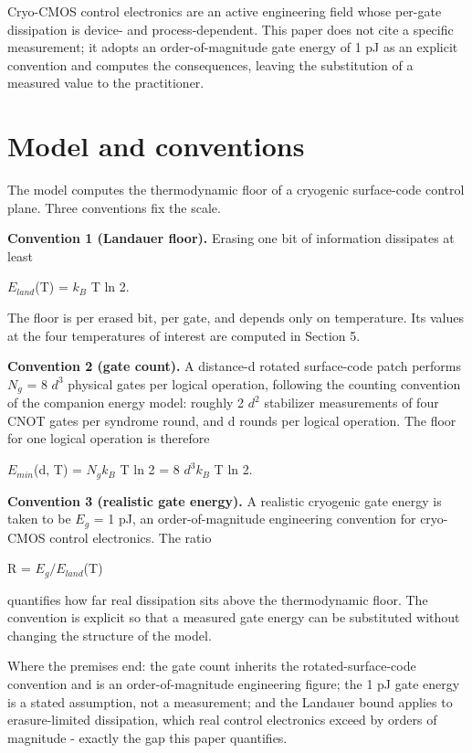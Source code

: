 \documentclass[11pt]{article}
\begin{document}
Cryo-CMOS control electronics are an active engineering field whose per-gate dissipation is device- and process-dependent. This paper does not cite a specific measurement; it adopts an order-of-magnitude gate energy of 1 pJ as an explicit convention and computes the consequences, leaving the substitution of a measured value to the practitioner.

\section{Model and conventions}
The model computes the thermodynamic floor of a cryogenic surface-code control plane. Three conventions fix the scale.

\textbf{Convention 1 (Landauer floor).} Erasing one bit of information dissipates at least

$E_{land}$(T) = $k_{B}$ T ln 2.

The floor is per erased bit, per gate, and depends only on temperature. Its values at the four temperatures of interest are computed in Section 5.

\textbf{Convention 2 (gate count).} A distance-d rotated surface-code patch performs $N_{g}$ = 8 $d^{3}$ physical gates per logical operation, following the counting convention of the companion energy model: roughly 2 $d^{2}$ stabilizer measurements of four CNOT gates per syndrome round, and d rounds per logical operation. The floor for one logical operation is therefore

$E_{min}$(d, T) = $N_{g}   k_{B}$ T ln 2 = 8 $d^{3}   k_{B}$ T ln 2.

\textbf{Convention 3 (realistic gate energy).} A realistic cryogenic gate energy is taken to be $E_{g}$ = 1 pJ, an order-of-magnitude engineering convention for cryo-CMOS control electronics. The ratio

R = $E_{g} / E_{land}$(T)

quantifies how far real dissipation sits above the thermodynamic floor. The convention is explicit so that a measured gate energy can be substituted without changing the structure of the model.

Where the premises end: the gate count inherits the rotated-surface-code convention and is an order-of-magnitude engineering figure; the 1 pJ gate energy is a stated assumption, not a measurement; and the Landauer bound applies to erasure-limited dissipation, which real control electronics exceed by orders of magnitude - exactly the gap this paper quantifies.
\end{document}

